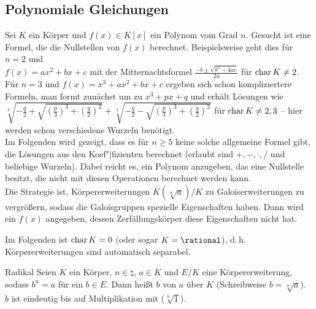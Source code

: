 \pagebreak

\subsection{%
    Polynomiale Gleichungen%
}

\begin{Bem}
    Sei $K$ ein Körper und $f(x) \in K[x]$ ein Polynom vom Grad $n$.
    Gesucht ist eine Formel, die die Nullstellen von $f(x)$ berechnet.
    Beispielsweise geht dies für $n = 2$ und\\
    $f(x) = ax^2 + bx + c$
    mit der Mitternachtsformel $\frac{-b \pm \sqrt{b^2 - 4ac}}{2a}$
    für $\operatorname{char} K \not= 2$.
    Für $n = 3$ und $f(x) = x^3 + ax^2 + bx + c$ ergeben sich schon
    kompliziertere Formeln, man formt zunächst um zu $x^3 + px + q$ und
    erhält Lösungen wie
    $\sqrt[3]{-\frac{q}{2} + \sqrt{\left(\frac{p}{3}\right)^3 +
    \left(\frac{q}{2}\right)^2}} +
    \sqrt[3]{-\frac{q}{2} - \sqrt{\left(\frac{p}{3}\right)^3 +
    \left(\frac{q}{2}\right)^2}}$
    für $\operatorname{char} K \not= 2, 3$ -- hier werden schon verschiedene Wurzeln
    benötigt.\\
    Im Folgenden wird gezeigt, dass es für $n \ge 5$ keine solche allgemeine
    Formel gibt, die Lösungen aus den Koef"|fizienten berechnet
    (erlaubt sind $+, -, \cdot, /$ und beliebige Wurzeln).
    Dabei reicht es, ein Polynom anzugeben, das eine Nullstelle besitzt,
    die nicht mit diesen Operationen berechnet werden kann.\\
    Die Strategie ist, Körpererweiterungen $K(\sqrt[n]{a})/K$ zu
    Galoiserweiterungen zu vergrößern,
    sodass die Galoisgruppen spezielle Eigenschaften haben.
    Dann wird ein $f(x)$ angegeben, dessen Zerfällungskörper diese
    Eigenschaften nicht hat.
\end{Bem}

\linie

\begin{Bem}
    Im Folgenden ist $\operatorname{char} K = 0$ (oder sogar $K = \rational$),
    d.\,h. Körpererweiterungen sind automatisch separabel.
\end{Bem}

\begin{Def}{Radikal}
    Seien $K$ ein Körper, $n \in \natural$, $a \in K$ und
    $E/K$ eine Körpererweiterung, sodass $b^n = a$ für ein $b \in E$.
    Dann heißt $b$  von $a$ über $K$
    (Schreibweise $b = \sqrt[n]{a}$).\\
    $b$ ist eindeutig bis auf Multiplikation mit 
    ($\sqrt[n]{1}$).
\end{Def}


